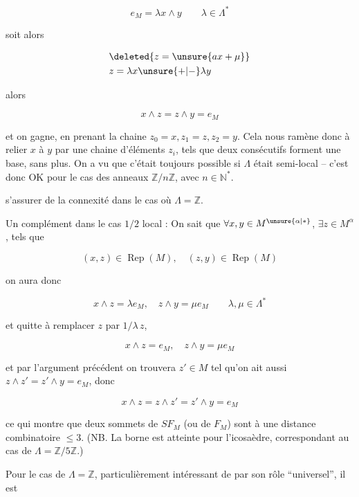 \[
e_M=\lambda x\wedge y\qquad\lambda\in\Lambda^*
\]

soit alors

\[
\begin{aligned}
&\deleted{z=\unsure{ax+ \mu}}\\
&z=\lambda x\unsure{+|-}\lambda y
\end{aligned}
\]

alors

\[
x\wedge z=z\wedge y=e_M
\]

et on gagne, en prenant la chaine $z_0=x,z_1=z,z_2=y$. Cela nous ramène donc à relier $x$ à $y$ par une chaine d'éléments $z_i$, tels que deux consécutifs forment une base, sans plus. On a
 vu que c'était toujours possible si $\Lambda$ était semi-local -- c'est donc OK pour le cas des anneaux $\mathbb{Z}/n\mathbb{Z}$, avec $n\in\mathbb{N}^*$.  


s'assurer de la connexité dans le cas où $\Lambda=\mathbb{Z}$.

Un complément dans le cas $1/2$ local :  On sait que  $\forall x,y\in M^{\unsure{\alpha|*}}$, $\exists z\in M^{\alpha}$, tels que

\[
(x,z)\in\operatorname{Rep}(M),\quad(z,y)\in\operatorname{Rep}(M)
\]

 on aura donc

\[
x\wedge z=\lambda e_M,\quad z\wedge y=\mu e_M\qquad\lambda,\mu\in\Lambda^*
\]

et quitte à remplacer $z$ par $1/\lambda\,z$, 

\[
x\wedge z=e_M,\quad z\wedge y=\mu e_M
\]

et par l'argument précédent on trouvera $z'\in M$ tel qu'on ait aussi $z\wedge z'=z'\wedge y=e_M$\unsure{)}, donc

\[
x\wedge z=z\wedge z'=z'\wedge y=e_M\tag*{(47)}
\]

ce qui montre que deux sommets de $SF_M$ (ou de $F_M$) sont à une distance combinatoire $\leq3$. (NB. La borne est atteinte pour l'icosaèdre, correspondant au cas de  $\Lambda=\mathbb{Z}/5\mathbb{Z}$.)

Pour le cas de $\Lambda=\mathbb{Z}$, particulièrement intéressant de par son rôle ``universel'', il est


